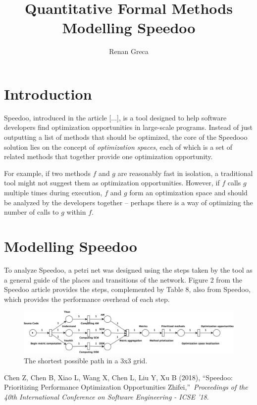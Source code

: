 \documentclass[11pt]{article}
\begin{document}
\title{Quantitative Formal Methods\\Modelling Speedoo}
\author{Renan Greca}
\maketitle

\section*{Introduction}
Speedoo, introduced in the article [...], is a tool designed to help software developers find optimization opportunities in large-scale programs.
Instead of just outputting a list of methods that should be optimized, the core of the Speedooo solution lies on the concept of \textit{optimization spaces}, each of which is a set of related methods that together provide one optimization opportunity.

For example, if two methods $f$ and $g$ are reasonably fast in isolation, a traditional tool might not suggest them as optimization opportunities.
However, if $f$ calls $g$ multiple times during execution, $f$ and $g$ form an optimization space and should be analyzed by the developers together -- perhaps there is a way of optimizing the number of calls to $g$ within $f$.

\section*{Modelling Speedoo}
To analyze Speedoo, a petri net was designed using the steps taken by the tool as a general guide of the places and transitions of the network.
Figure 2 from the Speedoo article provides the steps, complemented by Table 8, also from Speedoo, which provides the performance overhead of each step.

\begin{figure}[!htbp]
\centering
\includegraphics[scale=0.4]{speedoo_petrinet.png}
\caption{The shortest possible path in a 3x3 grid.}
\label{fig:vacuum3x3}
\end{figure}

\begin{thebibliography}{99}
 
 Chen Z, Chen B, Xiao L, Wang X, Chen L, Liu Y, Xu B (2018), \textquotedblleft Speedoo: Prioritizing Performance Optimization Opportunities Zhifei,\textquotedblright\ \textit{Proceedings of the 40th International Conference on Software Engineering  - ICSE '18}.

\end{thebibliography}
\end{document}
